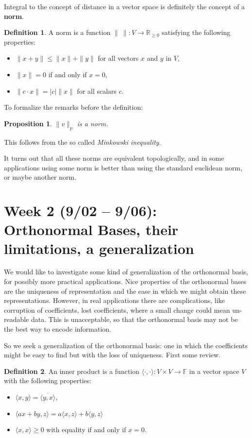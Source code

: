 \documentclass[12pt]{article}
\theoremstyle{plain}
\newtheorem{prop}{Proposition}
\theoremstyle{definition}
\newtheorem{defn}{Definition}
\begin{document}
Integral to the concept of distance in a vector space is definitely the concept of a \textbf{norm}.

\begin{defn}
A norm is a function $\|~\|\colon V \to \mathbb{R}_{\geq 0}$ satisfying the following properties:
\begin{itemize}
	\item $\|x + y\| \leq \|x\| + \|y\|$ for all vectors $x$ and $y$ in $V$,
	\item $\|x\| = 0$ if and only if $x = 0$,
	\item $\|c \cdot x\| = |c|\|x\|$ for all scalars $c$.
\end{itemize}
\end{defn}

To formalize the remarks before the definition:
\begin{prop}
	$\|v\|_p$ is a norm.
\end{prop}

This follows from the so called \textit{Minkowski inequality}.

It turns out that all these norms are equivalent topologically, and in some applications using some norm is better than using the standard euclidean norm, or maybe another norm.

\section{Week 2 (9/02 -- 9/06): Orthonormal Bases, their limitations, a generalization}

We would like to investigate some kind of generalization of the orthonormal basis, for possibly more practical applications. Nice properties of the orthonormal bases are the uniqueness of representation and the ease in which we might obtain these representations. However, in real applications there are complications, like corruption of coefficients, lost coefficients, where a small change could mean un-readable data. This is unacceptable, so that the orthonormal basis may not be the best way to encode information.

So we seek a generalization of the orthonormal basis: one in which the coefficients might be easy to find but with the loss of uniqueness. First some review.

\begin{defn}
An inner product is a function $\langle \cdot , \cdot \rangle \colon V \times V \to \mathbb{F}$ in a vector space $V$ with the following properties:
\begin{itemize}
	\item $\langle x, y \rangle = \overline{\langle y, x \rangle}$,
	\item $\langle ax + by, z \rangle = a\langle x, z \rangle + b\langle y, z\rangle$
	\item $\langle x, x \rangle \geq 0$ with equality if and only if $x = 0$.
\end{itemize}
\end{defn}
\end{document}
